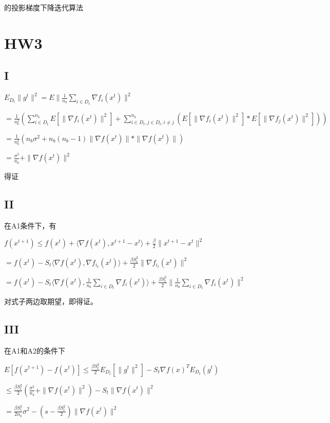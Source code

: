 \documentclass{xjtureport}
\begin{document}
的投影梯度下降迭代算法



\section{HW3}
\subsection{I}

$E_{D_{t}} \| g^{t} \| ^{2}=E \|\frac{1}{n_{b}} \sum_{i\in D_{t}} \nabla f_{i}(x^{t}) \| ^{2}$

$=\frac{1}{n_{b}^2}(\sum_{i\in D_{t}}^{n_{b}} E[\| \nabla f_{i}(x^t) \|^2] + \sum_{i\in D_{t},j\in D_{t},i \neq j}^{n_{b}} (E[\| \nabla f_{i}(x^t) \|^2] * E[\| \nabla f_{j}(x^t) \|^2]) )$

$=\frac{1}{n_{b}^2}(n_{b} \sigma ^{2} + n_{b}(n_{b} - 1) \|\nabla f(x^t)\| * \| \nabla f(x^t)\| )$

$=\frac{\sigma^2}{n_{b}} + \|\nabla f(x^t)\|^2$

得证

\subsection{II}
在A1条件下，有

$f(x^{t+1}) \leq f(x^t) + \langle \nabla f(x^t),x^{t+1} - x^{t} \rangle + \frac{\beta}{2} \|x^{t+1} - x^{t} \|^2$

$=f(x^t) -S_{t} \langle \nabla f(x^t),\nabla f_{i_{t}}(x^t) \rangle+ \frac{\beta S_{t}^{2}}{2}\| \nabla f_{i_{t}}(x^t)\| ^2 $

$=f(x^t) -S_{t} \langle \nabla f(x^t),\frac{1}{n_{b}}\sum_{i\in D_{t}} \nabla f_{i}(x^t) \rangle+ \frac{\beta S_{t}^{2}}{2}\| \frac{1}{n_{b}}\sum_{i\in D_{t}} \nabla f_{i}(x^t)\| ^2 $

对式子两边取期望，即得证。

\subsection{III}
在A1和A2的条件下

$E[f(x^{t+1})- f(x^t)] \leq \frac{\beta S_{t}^{2}}{2} E_{D_{t}}[\|g^t \|^2] - S_{t} \nabla f(x)^T E_{D_{t}}(g^t)$

$\leq \frac{\beta S_{t}^{2}}{2}(\frac{\sigma^2}{n_{b}} + \|\nabla f(x^t)\|^2) - S_{t} \|\nabla f(x^t) \|^2$

$=\frac{\beta S_{t}^{2}}{2n_{b}} \sigma ^2 - (s - \frac{\beta S_{t}^{2}}{2})\|\nabla f(x^t)\|^2$
\end{document}

